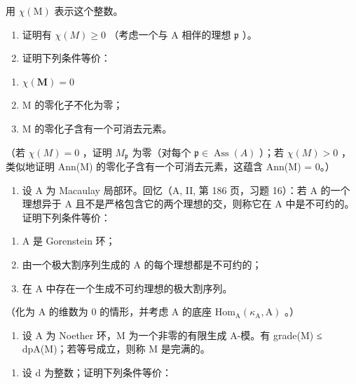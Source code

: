 用 \(\chi(\mathrm{M})\) 表示这个整数。

\begin{enumerate}
\def\labelenumi{\alph{enumi})}
\setcounter{enumi}{1}
\item
  证明有 \(\chi(M) \geqslant 0\) （考虑一个与 A 相伴的理想 \(\mathfrak{p}\) ）。
\item
  证明下列条件等价：
\end{enumerate}

\begin{enumerate}
\def\labelenumi{(\roman{enumi})}
\item
  \(\chi (\mathbf{M}) = 0\)
\item
  M 的零化子不化为零；
\item
  M 的零化子含有一个可消去元素。
\end{enumerate}

（若 \(\chi(M) = 0\) ，证明 \(M_{\mathfrak{p}}\) 为零（对每个 \(\mathfrak{p} \in \operatorname{Ass}(A)\) ）；若 \(\chi(M) > 0\) ，类似地证明 Ann(M) 的零化子含有一个可消去元素，这蕴含 Ann(M) = 0。）

\begin{enumerate}
\def\labelenumi{\arabic{enumi})}
\setcounter{enumi}{2}
\tightlist
\item
  设 A 为 Macaulay 局部环。回忆（A, II, 第 186 页，习题 16）：若 A 的一个理想异于 A 且不是严格包含它的两个理想的交，则称它在 A 中是不可约的。证明下列条件等价：
\end{enumerate}

\begin{enumerate}
\def\labelenumi{(\roman{enumi})}
\item
  A 是 Gorenstein 环；
\item
  由一个极大割序列生成的 A 的每个理想都是不可约的；
\item
  在 A 中存在一个生成不可约理想的极大割序列。
\end{enumerate}

（化为 A 的维数为 0 的情形，并考虑 A 的底座 \(\mathrm{Hom}_{\mathrm{A}}(\kappa_{\mathrm{A}},\mathrm{A})\) 。）

\begin{enumerate}
\def\labelenumi{\arabic{enumi})}
\setcounter{enumi}{3}
\tightlist
\item
  设 A 为 Noether 环，M 为一个非零的有限生成 A-模。有 grade(M) ≤ dpA(M)；若等号成立，则称 M 是完满的。
\end{enumerate}

\begin{enumerate}
\def\labelenumi{\alph{enumi})}
\tightlist
\item
  设 d 为整数；证明下列条件等价：
\end{enumerate}

